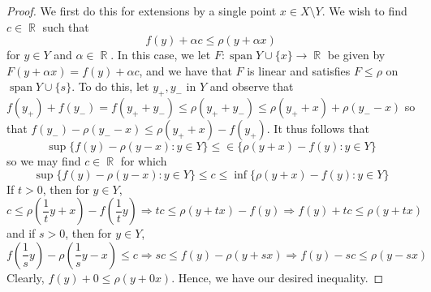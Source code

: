 \documentclass[11pt, a4paper]{memoir}
\DeclareMathOperator{\R}{{\mathbb{R}}}
\theoremstyle{change}
\theoremstyle{plain}
\theoremstyle{nonumberplain}
\newtheorem{proof}{Proof}
\DeclareMathOperator{\spn}{span}
\numberwithin{equation}{section}
\begin{document}
\begin{proof}
    We first do this for extensions by a single point $x\in X\setminus Y$.
    We wish to find $c\in\R$ such that
    \begin{equation*}
        f(y)+\alpha c\leq\rho(y+\alpha x)
    \end{equation*}
    for $y\in Y$ and $\alpha\in\R$.
    In this case, we let $F:\spn Y\cup\{x\}\to\R$ be given by $F(y+\alpha x)=f(y)+\alpha c$, and we have that $F$ is linear and satisfies $F\leq\rho$ on $\spn Y\cup\{s\}$.
    To do this, let $y_+,y_-$ in $Y$ and observe that $f(y_+)+f(y_-)=f(y_++y_-)\leq \rho(y_++y_-)\leq\rho(y_++x)+\rho(y_--x)$ so that $f(y_-)-\rho(y_--x)\leq\rho(y_++x)-f(y_+)$.
    It thus follows that
    \begin{equation*}
        \sup\{f(y)-\rho(y-x):y\in Y\}\leq\in\{\rho(y+x)-f(y):y\in Y\}
    \end{equation*}
    so we may find $c\in\R$ for which
    \begin{equation*}
        \sup\{f(y)-\rho(y-x):y\in Y\}\leq c\leq\inf\{\rho(y+x)-f(y):y\in Y\}
    \end{equation*}
    If $t>0$, then for $y\in Y$,
    \begin{equation*}
        c\leq\rho\left(\frac{1}{t}y+x\right)-f\left(\frac{1}{t}y\right)\Rightarrow tc\leq\rho(y+tx)-f(y)\Rightarrow f(y)+tc\leq\rho(y+tx)
    \end{equation*}
    and if $s>0$, then for $y\in Y$,
    \begin{equation*}
        f\left(\frac{1}{s}y\right)-\rho\left(\frac{1}{s}y-x\right)\leq c\Rightarrow sc\leq f(y)-\rho(y+sx)\Rightarrow f(y)-sc\leq\rho(y-sx)
    \end{equation*}
    Clearly, $f(y)+0\leq\rho(y+0x)$.
    Hence, we have our desired inequality.


\end{proof}
\end{document}

